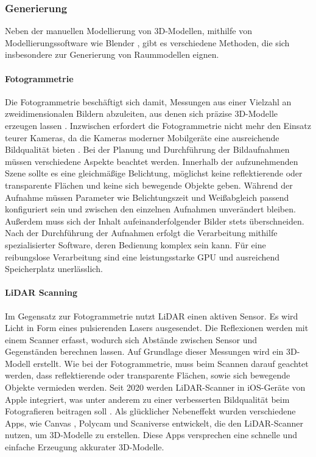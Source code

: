 \subsubsection{Generierung}
Neben der manuellen Modellierung von 3D-Modellen, mithilfe von Modellierungssoftware wie Blender \cite{Blender}, gibt es verschiedene Methoden, die sich insbesondere zur Generierung von Raummodellen eignen.

\paragraph{Fotogrammetrie}

Die Fotogrammetrie beschäftigt sich damit, Messungen aus einer Vielzahl an zweidimensionalen Bildern abzuleiten, aus denen sich präzise 3D-Modelle erzeugen lassen \cite[S.~19]{Aber2010}. Inzwischen erfordert die Fotogrammetrie nicht mehr den Einsatz teurer Kameras, da die Kameras moderner Mobilgeräte eine ausreichende Bildqualität bieten \cite{Cohrs2021}. Bei der Planung und Durchführung der Bildaufnahmen müssen verschiedene Aspekte beachtet werden. Innerhalb der aufzunehmenden Szene sollte es eine gleichmäßige Belichtung, möglichst keine reflektierende oder transparente Flächen und keine sich bewegende Objekte geben. Während der Aufnahme müssen Parameter wie Belichtungszeit und Weißabgleich passend konfiguriert sein und zwischen den einzelnen Aufnahmen unverändert bleiben. Außerdem muss sich der Inhalt aufeinanderfolgender Bilder stets überschneiden.\cite{Cohrs2021b} Nach der Durchführung der Aufnahmen erfolgt die Verarbeitung mithilfe spezialisierter Software, deren Bedienung komplex sein kann. Für eine reibungslose Verarbeitung sind eine leistungsstarke \ac{GPU} und ausreichend Speicherplatz unerlässlich.\cite{Cohrs2021c}

\paragraph{LiDAR Scanning}
Im Gegensatz zur Fotogrammetrie nutzt \ac{LiDAR} einen aktiven Sensor. Es wird Licht in Form eines pulsierenden Lasers ausgesendet. Die Reflexionen werden mit einem Scanner erfasst, wodurch sich Abstände zwischen Sensor und Gegenständen berechnen lassen. Auf Grundlage dieser Messungen wird ein 3D-Modell erstellt. Wie bei der Fotogrammetrie, muss beim Scannen darauf geachtet werden, dass reflektierende oder transparente Flächen, sowie sich bewegende Objekte vermieden werden. Seit 2020 werden \ac{LiDAR}-Scanner in iOS-Geräte von Apple integriert, was unter anderem zu einer verbesserten Bildqualität beim Fotografieren beitragen soll \cite{Fenstermaker2022}. Als glücklicher Nebeneffekt wurden verschiedene Apps, wie Canvas \cite{Canvas2023}, Polycam \cite{Polycam2024} und Scaniverse \cite{Scaniverse2024} entwickelt, die den \ac{LiDAR}-Scanner nutzen, um 3D-Modelle zu erstellen. Diese Apps versprechen eine schnelle und einfache Erzeugung akkurater 3D-Modelle.

